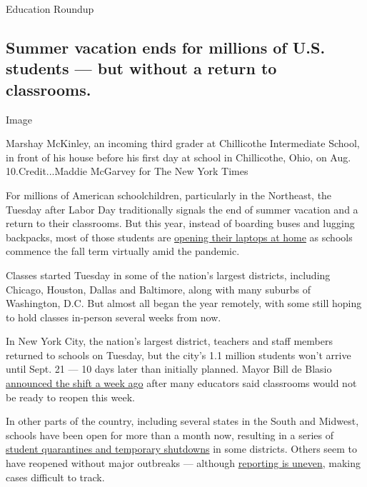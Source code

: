 Education Roundup

\hypertarget{summer-vacation-ends-for-millions-of-us-students--but-without-a-return-to-classrooms}{%
\subsection{Summer vacation ends for millions of U.S. students --- but
without a return to
classrooms.}\label{summer-vacation-ends-for-millions-of-us-students--but-without-a-return-to-classrooms}}

Image

Marshay McKinley, an incoming third grader at Chillicothe Intermediate
School, in front of his house before his first day at school in
Chillicothe, Ohio, on Aug. 10.Credit...Maddie McGarvey for The New York
Times

For millions of American schoolchildren, particularly in the Northeast,
the Tuesday after Labor Day traditionally signals the end of summer
vacation and a return to their classrooms. But this year, instead of
boarding buses and lugging backpacks, most of those students are
\href{https://www.nytimes3xbfgragh.onion/2020/09/05/us/virtual-return-to-school-covid.html}{opening
their laptops at home} as schools commence the fall term virtually amid
the pandemic.

Classes started Tuesday in some of the nation's largest districts,
including Chicago, Houston, Dallas and Baltimore, along with many
suburbs of Washington, D.C. But almost all began the year remotely, with
some still hoping to hold classes in-person several weeks from now.

In New York City, the nation's largest district, teachers and staff
members returned to schools on Tuesday, but the city's 1.1 million
students won't arrive until Sept. 21 --- 10 days later than initially
planned. Mayor Bill de Blasio
\href{https://www.nytimes3xbfgragh.onion/2020/09/01/nyregion/schools-open-coronavirus-nyc.html}{announced
the shift a week ago} after many educators said classrooms would not be
ready to reopen this week.

In other parts of the country, including several states in the South and
Midwest, schools have been open for more than a month now, resulting in
a series of
\href{https://www.nytimes3xbfgragh.onion/2020/08/12/us/georgia-school-coronavirus.html}{student
quarantines and temporary shutdowns} in some districts. Others seem to
have reopened without major outbreaks --- although
\href{https://www.nytimes3xbfgragh.onion/2020/08/22/us/school-reopenings-coronavirus-reporting.html}{reporting
is uneven}, making cases difficult to track.

